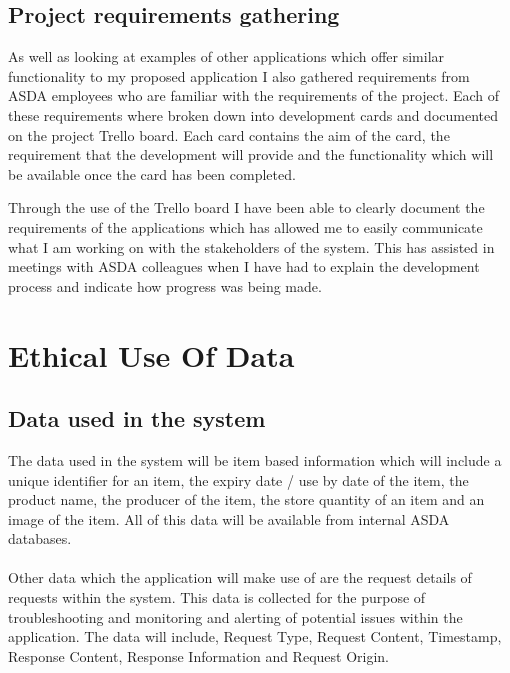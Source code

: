 \documentclass[a4paper,11pt]{report}
\begin{document}
\section{Project requirements gathering}

As well as looking at examples of other applications which offer similar functionality to my proposed
application I also gathered requirements from ASDA employees who are familiar with the requirements 
of the project. Each of these requirements where broken down into development cards and documented on
the project Trello board. Each card contains the aim of the card, the requirement that the development
will provide and the functionality which will be available once the card has been completed. 




Through the use of the Trello board I have been able to clearly document the requirements of the applications which has allowed me to easily communicate what I am working on with the stakeholders of the system. This has assisted in meetings with ASDA colleagues when I have had to explain the development process and indicate how progress was being made.

\chapter{Ethical Use Of Data}
\section{Data used in the system}
The data used in the system will be item based information which will include a unique identifier
for an item, the expiry date / use by date of the item, the product name, the producer of the item, 
the store quantity of an item and an image of the item. 
All of this data will be available from internal ASDA databases. 
\\
\\
Other data which the application will make use of are the request details of requests 
within the system. This data is collected for the purpose of troubleshooting and monitoring
and alerting of potential issues within the application. The data will include, Request Type,
Request Content, Timestamp, Response Content, Response Information and Request Origin.
   
\end{document}
